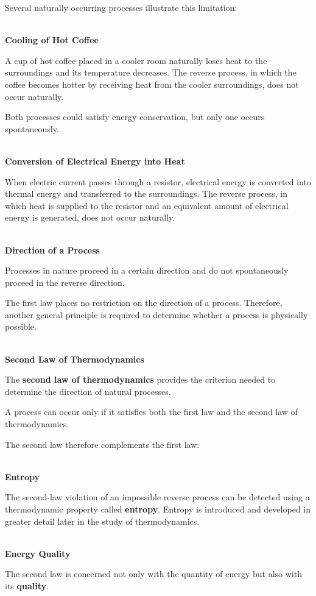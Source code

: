 \documentclass[12pt]{article}
\begin{document}
Several naturally occurring processes illustrate this limitation:

\textbf{\\ Cooling of Hot Coffee}

A cup of hot coffee placed in a cooler room naturally loses heat to the surroundings and its temperature decreases. The reverse process, in which the coffee becomes hotter by receiving heat from the cooler surroundings, does not occur naturally.

Both processes could satisfy energy conservation, but only one occurs spontaneously.

\textbf{\\ Conversion of Electrical Energy into Heat}

When electric current passes through a resistor, electrical energy is converted into thermal energy and transferred to the surroundings. The reverse process, in which heat is supplied to the resistor and an equivalent amount of electrical energy is generated, does not occur naturally.

\textbf{\\ Direction of a Process}

Processes in nature proceed in a certain direction and do not spontaneously proceed in the reverse direction.

The first law places no restriction on the direction of a process. Therefore, another general principle is required to determine whether a process is physically possible.

\textbf{\\ Second Law of Thermodynamics}

The \textbf{second law of thermodynamics} provides the criterion needed to determine the direction of natural processes.

A process can occur only if it satisfies both the first law and the second law of thermodynamics.

The second law therefore complements the first law:


\textbf{\\ Entropy}

The second-law violation of an impossible reverse process can be detected using a thermodynamic property called \textbf{entropy}. Entropy is introduced and developed in greater detail later in the study of thermodynamics.

\textbf{\\ Energy Quality}

The second law is concerned not only with the quantity of energy but also with its \textbf{quality}.
\end{document}
